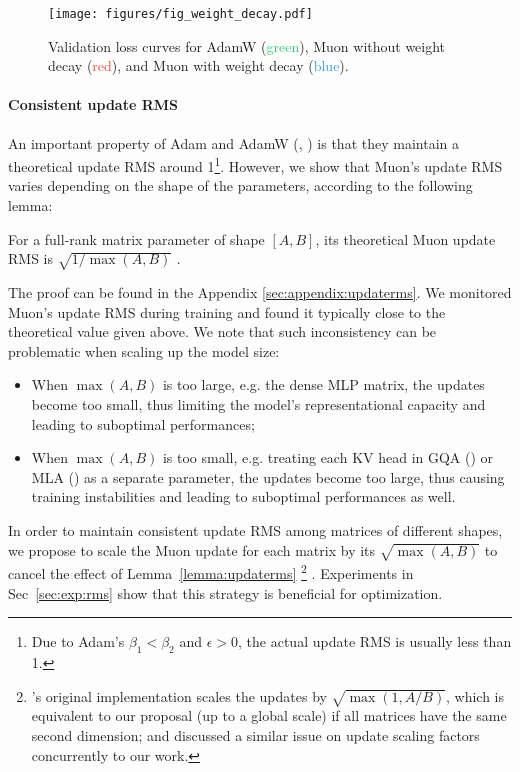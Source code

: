 \begin{figure}[t]
    \centering
    \texttt{[image: figures/fig\_weight\_decay.pdf]}
    \caption{\small Validation loss curves for AdamW (\textcolor[HTML]{2ecc71}{green}), Muon without weight decay (\textcolor[HTML]{e74c3c}{red}), and Muon with weight decay (\textcolor[HTML]{3498db}{blue}).} 
    \label{fig_weight_decay} 
\end{figure}



\paragraph{Consistent update RMS}
An important property of Adam and AdamW (\cite{adam2015kingma}, \cite{loshchilov2018decoupled}) is that they maintain a theoretical update RMS around 1\footnote{Due to Adam's $\beta_1 < \beta_2$ and $\epsilon > 0$, the actual update RMS is usually less than 1.}. However, we show that Muon's update RMS varies depending on the shape of the parameters, according to the following lemma:

\begin{lemma}
\label{lemma:updaterms}
For a full-rank matrix parameter of shape $[A, B]$, its theoretical Muon update RMS is $\sqrt{1/\max(A,B)}$ .
\end{lemma}

The proof can be found in the Appendix \ref{sec:appendix:updaterms}. We monitored Muon's update RMS during training and found it typically close to the theoretical value given above. We note that such inconsistency can be problematic when scaling up the model size:

\begin{itemize}
    \item When $\max(A,B)$ is too large, e.g. the dense MLP matrix, the updates become too small, thus limiting the model's representational capacity and leading to suboptimal performances; 
    
    \item When $\max(A,B)$ is too small, e.g. treating each KV head in GQA (\cite{shazeer2019fasttransformerdecodingwritehead}) or MLA (\cite{deepseekai2024deepseekv3technicalreport}) as a separate parameter, the updates become too large, thus causing training instabilities and leading to suboptimal performances as well.
\end{itemize}

In order to maintain consistent update RMS among matrices of different shapes, we 
propose to scale the Muon update for each matrix by its $\sqrt{\max(A, B)}$ to cancel the effect of Lemma~\ref{lemma:updaterms} \footnote{\cite{jordan2024muon}'s original implementation scales the updates by $\sqrt{\max(1, A/B)}$, which is equivalent to our proposal (up to a global scale) if all matrices have the same second dimension; \cite{pethick2025trainingdeeplearningmodels} and \cite{JiachengX} discussed a similar issue on update scaling factors concurrently to our work. } . 
Experiments in Sec~\ref{sec:exp:rms} show that this strategy is beneficial for optimization.

